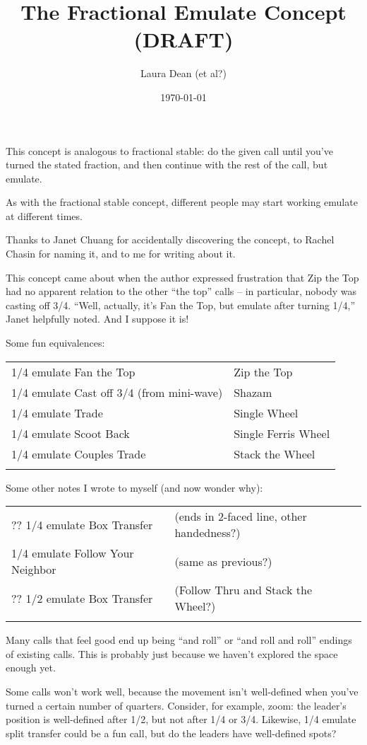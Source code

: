 \documentclass[11pt]{article}
\title{The Fractional Emulate Concept (DRAFT)}
\author{Laura Dean (et al?)}
\date{\today}
\begin{document}
\thispagestyle{empty}
\maketitle


This concept is analogous to fractional stable:
do the given call until you've turned the stated fraction,
and then continue with the rest of the call, but emulate.

As with the fractional stable concept, different people may start
working emulate at different times.

Thanks to Janet Chuang for accidentally discovering the concept,
to Rachel Chasin for naming it, and to me for writing about it.

This concept came about when the author expressed frustration that Zip
the Top had no apparent relation to the other ``the top'' calls -- in
particular, nobody was casting off 3/4. 
``Well, actually, it's Fan the Top, but emulate after turning 1/4,''
Janet helpfully noted.  And I suppose it is!

Some fun equivalences:

\begin{tabular}{ll}
\hline
1/4 emulate Fan the Top   & Zip the Top \\
1/4 emulate Cast off 3/4 (from mini-wave)  & Shazam \\
1/4 emulate Trade                          & Single Wheel \\
1/4 emulate Scoot Back  & Single Ferris Wheel \\
1/4 emulate Couples Trade  & Stack the Wheel \\
\hline \\
\end{tabular}

Some other notes I wrote to myself (and now wonder why):

\begin{tabular}{ll}
\hline
?? 1/4 emulate Box Transfer  & (ends in 2-faced line, other handedness?) \\
1/4 emulate Follow Your Neighbor  & (same as previous?) \\
?? 1/2 emulate Box Transfer  & (Follow Thru and Stack the Wheel?) \\
\hline \\
\end{tabular}


Many calls that feel good end up being ``and roll'' or ``and roll and
roll'' endings of existing calls.  This is probably just because we
haven't explored the space enough yet.

Some calls won't work well, because the movement isn't well-defined
when you've turned a certain number of quarters.  Consider, for
example, zoom: the leader's position is well-defined after 1/2, but
not after 1/4 or 3/4.  Likewise, 1/4 emulate split transfer could be a
fun call, but do the leaders have well-defined spots?
\end{document}
